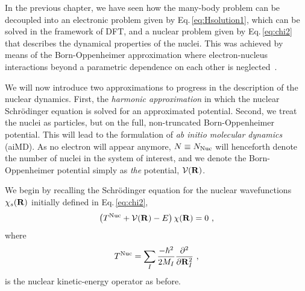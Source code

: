 In the previous chapter, we have seen how the many-body problem can be decoupled into an electronic problem given by Eq.\,\eqref{eq:Hsolution1}, which can be solved in the framework of DFT, and a nuclear problem given by Eq.\,\eqref{eq:chi2} that describes the dynamical properties of the nuclei. This was achieved by means of the Born-Oppenheimer approximation where electron-nucleus interactions beyond a parametric dependence on each other is neglected~\cite{BornOppenheimer}.

We will now introduce two approximations to progress in the description of the nuclear dynamics. First, the \emph{harmonic approximation} in which the nuclear Schr\"odinger equation is solved for an approximated potential. Second, we treat the nuclei as particles, but on the full, non-truncated Born-Oppenheimer potential. This will lead to the formulation of \emph{ab initio molecular dynamics} (aiMD). As no electron will appear anymore, $N \equiv N_{\rm Nuc}$ will henceforth denote the number of nuclei in the system of interest, and we denote the Born-Oppenheimer potential simply as \emph{the} potential, $\mathcal V ({\bf R})$.

We begin by recalling the Schr\"odinger equation for the nuclear wavefunctions $\chi_s ({\bf R})$ initially defined in Eq.\,\eqref{eq:chi2},
\begin{align}
  \left( T^{\rm Nuc} + \mathcal V ({\bf R}) - E \right) \chi ({\bf R})
  = 0~,
  \label{eq:BOSE}
\end{align}
where
\begin{align}
  T^{\rm Nuc}
    = \sum_I \frac{- \hbar^2}{2 M_I} \frac{\partial^2}{\partial {\bf R}_I^2}~,
  \label{eq:Tnuc2}
\end{align}
is the nuclear kinetic-energy operator as before.

